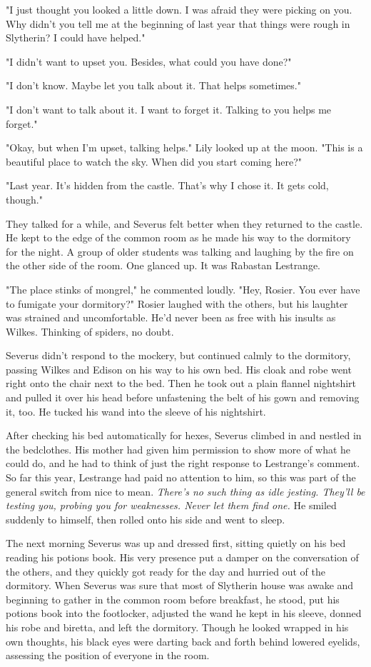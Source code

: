 \documentclass[a4paper,11pt]{article}
\begin{document}
"I just thought you looked a little down. I was afraid they were picking on you. Why didn't you tell me at the beginning of last year that things were rough in Slytherin? I could have helped."

"I didn't want to upset you. Besides, what could you have done?"

"I don't know. Maybe let you talk about it. That helps sometimes."

"I don't want to talk about it. I want to forget it. Talking to you helps me forget."

"Okay, but when I'm upset, talking helps." Lily looked up at the moon. "This is a beautiful place to watch the sky. When did you start coming here?"

"Last year. It's hidden from the castle. That's why I chose it. It gets cold, though."

They talked for a while, and Severus felt better when they returned to the castle. He kept to the edge of the common room as he made his way to the dormitory for the night. A group of older students was talking and laughing by the fire on the other side of the room. One glanced up. It was Rabastan Lestrange.

"The place stinks of mongrel," he commented loudly. "Hey, Rosier. You ever have to fumigate your dormitory?" Rosier laughed with the others, but his laughter was strained and uncomfortable. He'd never been as free with his insults as Wilkes. Thinking of spiders, no doubt.

Severus didn't respond to the mockery, but continued calmly to the dormitory, passing Wilkes and Edison on his way to his own bed. His cloak and robe went right onto the chair next to the bed. Then he took out a plain flannel nightshirt and pulled it over his head before unfastening the belt of his gown and removing it, too. He tucked his wand into the sleeve of his nightshirt.

After checking his bed automatically for hexes, Severus climbed in and nestled in the bedclothes. His mother had given him permission to show more of what he could do, and he had to think of just the right response to Lestrange's comment. So far this year, Lestrange had paid no attention to him, so this was part of the general switch from nice to mean. \emph{There's no such thing as idle jesting. They'll be testing you, probing you for weaknesses. Never let them find one.} He smiled suddenly to himself, then rolled onto his side and went to sleep.

The next morning Severus was up and dressed first, sitting quietly on his bed reading his potions book. His very presence put a damper on the conversation of the others, and they quickly got ready for the day and hurried out of the dormitory. When Severus was sure that most of Slytherin house was awake and beginning to gather in the common room before breakfast, he stood, put his potions book into the footlocker, adjusted the wand he kept in his sleeve, donned his robe and biretta, and left the dormitory. Though he looked wrapped in his own thoughts, his black eyes were darting back and forth behind lowered eyelids, assessing the position of everyone in the room.
\end{document}
